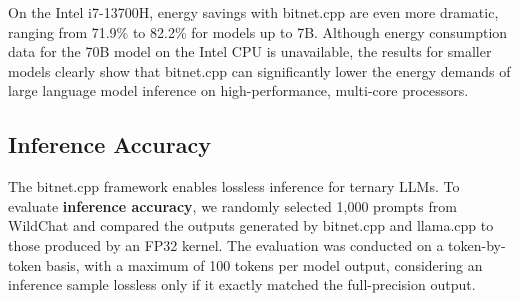 \documentclass{article}
\newcommand\bitnet{\text{BitNet b1.58}}
\begin{document}
On the Intel i7-13700H, energy savings with bitnet.cpp are even more dramatic, ranging from 71.9\% to 82.2\% for models up to 7B. Although energy consumption data for the 70B model on the Intel CPU is unavailable, the results for smaller models clearly show that bitnet.cpp can significantly lower the energy demands of large language model inference on high-performance, multi-core processors.

\begin{table}[H]
    \centering
    \vspace{0.2cm}
    \caption{Comparison of Energy Costs Across CPUs (Unit: J/Token). "N/A" indicates that the specific model size cannot be hosted on the tested CPU with the given kernel.}
    \label{tab:energy_thread_unlimited}
\end{table}


\subsection{Inference Accuracy}

The bitnet.cpp framework enables lossless inference for ternary \bitnet{} LLMs. To evaluate \textbf{inference accuracy}, we randomly selected 1,000 prompts from WildChat \cite{zhao2024wildchat} and compared the outputs generated by bitnet.cpp and llama.cpp to those produced by an FP32 kernel. The evaluation was conducted on a token-by-token basis, with a maximum of 100 tokens per model output, considering an inference sample lossless only if it exactly matched the full-precision output. 
\end{document}
